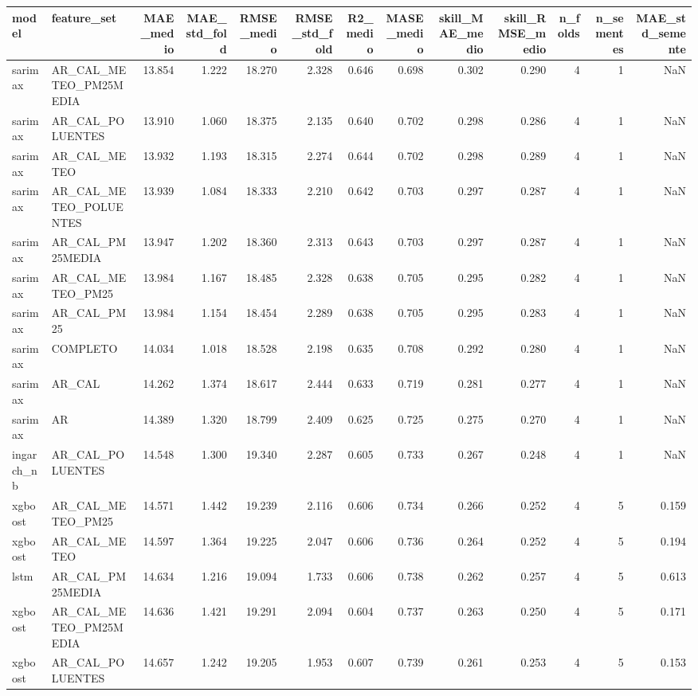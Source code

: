 \begin{tabular}{llrrrrrrrrrrr}
\toprule
model & feature_set & MAE_medio & MAE_std_fold & RMSE_medio & RMSE_std_fold & R2_medio & MASE_medio & skill_MAE_medio & skill_RMSE_medio & n_folds & n_sementes & MAE_std_semente \\
\midrule
sarimax & AR_CAL_METEO_PM25MEDIA & 13.854 & 1.222 & 18.270 & 2.328 & 0.646 & 0.698 & 0.302 & 0.290 & 4 & 1 & NaN \\
sarimax & AR_CAL_POLUENTES & 13.910 & 1.060 & 18.375 & 2.135 & 0.640 & 0.702 & 0.298 & 0.286 & 4 & 1 & NaN \\
sarimax & AR_CAL_METEO & 13.932 & 1.193 & 18.315 & 2.274 & 0.644 & 0.702 & 0.298 & 0.289 & 4 & 1 & NaN \\
sarimax & AR_CAL_METEO_POLUENTES & 13.939 & 1.084 & 18.333 & 2.210 & 0.642 & 0.703 & 0.297 & 0.287 & 4 & 1 & NaN \\
sarimax & AR_CAL_PM25MEDIA & 13.947 & 1.202 & 18.360 & 2.313 & 0.643 & 0.703 & 0.297 & 0.287 & 4 & 1 & NaN \\
sarimax & AR_CAL_METEO_PM25 & 13.984 & 1.167 & 18.485 & 2.328 & 0.638 & 0.705 & 0.295 & 0.282 & 4 & 1 & NaN \\
sarimax & AR_CAL_PM25 & 13.984 & 1.154 & 18.454 & 2.289 & 0.638 & 0.705 & 0.295 & 0.283 & 4 & 1 & NaN \\
sarimax & COMPLETO & 14.034 & 1.018 & 18.528 & 2.198 & 0.635 & 0.708 & 0.292 & 0.280 & 4 & 1 & NaN \\
sarimax & AR_CAL & 14.262 & 1.374 & 18.617 & 2.444 & 0.633 & 0.719 & 0.281 & 0.277 & 4 & 1 & NaN \\
sarimax & AR & 14.389 & 1.320 & 18.799 & 2.409 & 0.625 & 0.725 & 0.275 & 0.270 & 4 & 1 & NaN \\
ingarch_nb & AR_CAL_POLUENTES & 14.548 & 1.300 & 19.340 & 2.287 & 0.605 & 0.733 & 0.267 & 0.248 & 4 & 1 & NaN \\
xgboost & AR_CAL_METEO_PM25 & 14.571 & 1.442 & 19.239 & 2.116 & 0.606 & 0.734 & 0.266 & 0.252 & 4 & 5 & 0.159 \\
xgboost & AR_CAL_METEO & 14.597 & 1.364 & 19.225 & 2.047 & 0.606 & 0.736 & 0.264 & 0.252 & 4 & 5 & 0.194 \\
lstm & AR_CAL_PM25MEDIA & 14.634 & 1.216 & 19.094 & 1.733 & 0.606 & 0.738 & 0.262 & 0.257 & 4 & 5 & 0.613 \\
xgboost & AR_CAL_METEO_PM25MEDIA & 14.636 & 1.421 & 19.291 & 2.094 & 0.604 & 0.737 & 0.263 & 0.250 & 4 & 5 & 0.171 \\
xgboost & AR_CAL_POLUENTES & 14.657 & 1.242 & 19.205 & 1.953 & 0.607 & 0.739 & 0.261 & 0.253 & 4 & 5 & 0.153 \\

\end{tabular}
